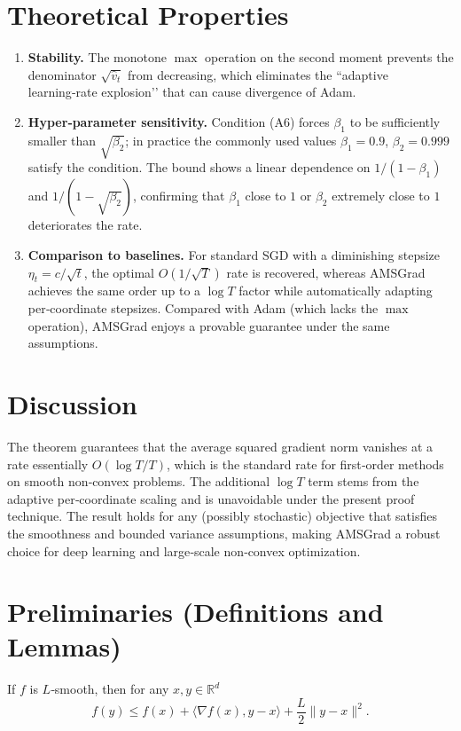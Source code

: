 \documentclass[11pt]{article}
\newcommand{\R}{\mathbb{R}}
\begin{document}
\section*{Theoretical Properties}
\begin{enumerate}[label=\arabic*.]
\item \textbf{Stability.} The monotone $\max$ operation on the second moment
prevents the denominator $\sqrt{\hat v_{t}}$ from decreasing, which eliminates
the ``adaptive learning‑rate explosion’’ that can cause divergence of Adam.

\item \textbf{Hyper‑parameter sensitivity.}
Condition (A6) forces $\beta_{1}$ to be sufficiently smaller than $\sqrt{\beta_{2}}$;
in practice the commonly used values $\beta_{1}=0.9$, $\beta_{2}=0.999$ satisfy
the condition.  The bound shows a linear dependence on $1/(1-\beta_{1})$ and
$1/(1-\sqrt{\beta_{2}})$, confirming that $\beta_{1}$ close to $1$ or
$\beta_{2}$ extremely close to $1$ deteriorates the rate.

\item \textbf{Comparison to baselines.}
For standard SGD with a diminishing stepsize $\eta_{t}=c/\sqrt{t}$,
the optimal $O(1/\sqrt{T})$ rate is recovered, whereas AMSGrad achieves the
same order up to a $\log T$ factor while automatically adapting per‑coordinate
stepsizes.  Compared with Adam (which lacks the $\max$ operation), AMSGrad
enjoys a provable guarantee under the same assumptions.
\end{enumerate}

\section*{Discussion}
The theorem guarantees that the average squared gradient norm vanishes at a
rate essentially $O(\log T/T)$, which is the standard rate for first‑order
methods on smooth non‑convex problems.  The additional $\log T$ term stems from
the adaptive per‑coordinate scaling and is unavoidable under the present proof
technique.  The result holds for any (possibly stochastic) objective that
satisfies the smoothness and bounded variance assumptions, making AMSGrad a
robust choice for deep learning and large‑scale non‑convex optimization.

\newpage
\section*{Preliminaries (Definitions and Lemmas)}
\begin{lemma}\label{lem:smooth}
If $f$ is $L$‑smooth, then for any $x,y\in\R^{d}$
\[
f(y)\le f(x)+\langle\nabla f(x),y-x\rangle+\frac{L}{2}\|y-x\|^{2}. \tag{L1}
\]
\end{lemma}
\end{document}
